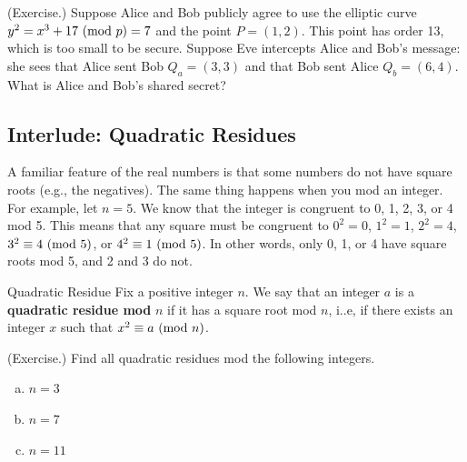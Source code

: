 \documentclass[letterpaper]{article}
\begin{document}
\begin{mdframed}
    (Exercise.) Suppose Alice and Bob publicly agree to use the elliptic curve $y^2 = x^3 + 17 \ (\mathrm{mod}\ p) = 7$ and the point $P = (1, 2)$. This point has order 13, which is too small to be secure. Suppose Eve intercepts Alice and Bob's message: she sees that Alice sent Bob $Q_a = (3, 3)$ and that Bob sent Alice $Q_b = (6, 4)$. What is Alice and Bob's shared secret? 
    \begin{mdframed}
        
    \end{mdframed}
\end{mdframed}

\subsection{Interlude: Quadratic Residues}
A familiar feature of the real numbers is that some numbers do not have square roots (e.g., the negatives). The same thing happens when you mod an integer. For example, let $n = 5$. We know that the integer is congruent to 0, 1, 2, 3, or 4 mod 5. This means that any square must be congruent to $0^2 = 0$, $1^2 = 1$, $2^2 = 4$, $3^2 \equiv 4 \ (\mathrm{mod}\ 5)$, or $4^2 \equiv 1 \ (\mathrm{mod}\ 5)$. In other words, only 0, 1, or 4 have square roots mod 5, and 2 and 3 do not.

\begin{definition}{Quadratic Residue}{}
    Fix a positive integer $n$. We say that an integer $a$ is a \textbf{quadratic residue mod }$n$ if it has a square root mod $n$, i..e, if there exists an integer $x$ such that $x^2 \equiv a \ (\mathrm{mod}\ n)$. 
\end{definition}

\begin{mdframed}
    (Exercise.) Find all quadratic residues mod the following integers. 
    \begin{enumerate}[(a)]
        \item $n = 3$
        \begin{mdframed}
            
        \end{mdframed}
        \item $n = 7$
        \begin{mdframed}
            
        \end{mdframed}
        \item $n = 11$
        \begin{mdframed}
            
        \end{mdframed}
    \end{enumerate}
\end{mdframed}
\end{document}
